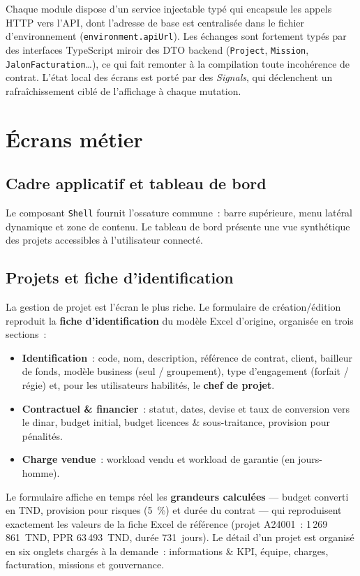 Chaque module dispose d'un service injectable typé qui encapsule les appels HTTP vers l'API,
dont l'adresse de base est centralisée dans le fichier d'environnement
(\texttt{environment.apiUrl}). Les échanges sont fortement typés par des interfaces TypeScript
miroir des DTO backend (\texttt{Project}, \texttt{Mission}, \texttt{JalonFacturation}\dots), ce qui
fait remonter à la compilation toute incohérence de contrat. L'état local des écrans est porté par
des \emph{Signals}, qui déclenchent un rafraîchissement ciblé de l'affichage à chaque mutation.

\section{Écrans métier}

\subsection{Cadre applicatif et tableau de bord}
Le composant \texttt{Shell} fournit l'ossature commune~: barre supérieure, menu latéral dynamique et
zone de contenu. Le tableau de bord présente une vue synthétique des projets accessibles à
l'utilisateur connecté.

\subsection{Projets et fiche d'identification}
La gestion de projet est l'écran le plus riche. Le formulaire de création/édition reproduit la
\textbf{fiche d'identification} du modèle Excel d'origine, organisée en trois sections~:

\begin{itemize}
  \item \textbf{Identification}~: code, nom, description, référence de contrat, client, bailleur de
        fonds, modèle business (seul / groupement), type d'engagement (forfait / régie) et, pour les
        utilisateurs habilités, le \textbf{chef de projet}.
  \item \textbf{Contractuel \& financier}~: statut, dates, devise et taux de conversion vers le
        dinar, budget initial, budget licences \& sous-traitance, provision pour pénalités.
  \item \textbf{Charge vendue}~: workload vendu et workload de garantie (en jours-homme).
\end{itemize}

\noindent Le formulaire affiche en temps réel les \textbf{grandeurs calculées} --- budget converti en
TND, provision pour risques (5~\%) et durée du contrat --- qui reproduisent exactement les valeurs de
la fiche Excel de référence (projet A24001~: 1\,269\,861~TND, PPR 63\,493~TND, durée 731~jours). Le
détail d'un projet est organisé en six onglets chargés à la demande~: informations \& KPI, équipe,
charges, facturation, missions et gouvernance.

